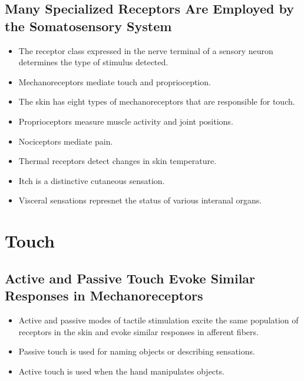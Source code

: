 \documentclass[12pt,a4paper]{article}
\begin{document}
\subsection{Many Specialized Receptors Are Employed by the Somatosensory System}
\begin{itemize}
    \item The receptor class expressed in the nerve terminal of a sensory neuron determines the type of stimulus detected.
    \item Mechanoreceptors mediate touch and proprioception.
    \item The skin has eight types of mechanoreceptors that are responsible for touch.
    \item Proprioceptors measure muscle activity and joint positions.
    \item Nociceptors mediate pain.
    \item Thermal receptors detect changes in skin temperature.
    \item Itch is a distinctive cutaneous sensation.
    \item Visceral sensations represnet the status of various interanal organs.
\end{itemize}

\clearpage
\section{Touch}
\subsection{Active and Passive Touch Evoke Similar Responses in Mechanoreceptors}
\begin{itemize}
    \item Active and passive modes of tactile stimulation excite the same population of receptors in the skin and evoke similar responses in afferent fibers.
    \item Passive touch is used for naming objects or describing sensations.
    \item Active touch is used when the hand manipulates objects.
\end{itemize}
\end{document}
